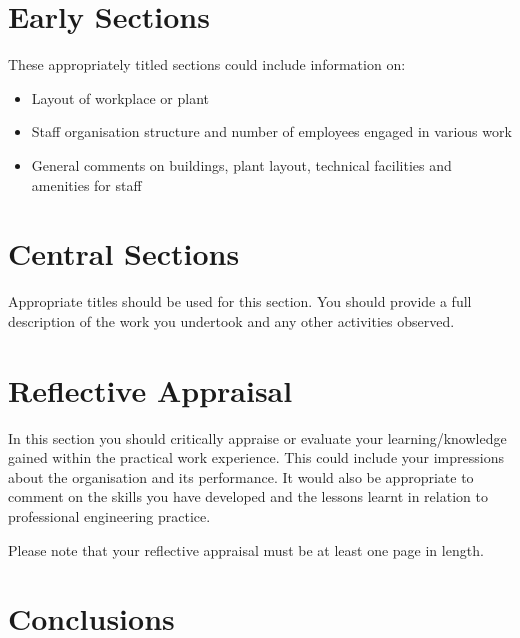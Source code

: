 \documentclass[pdftex, 12pt, a4paper, twoside]{article} %
\let\oldsection\section
\def\section{\clearpage\oldsection}
\begin{document}
\section{Early Sections}
\label{sec:earlysections}

These appropriately titled sections could include information on:

\begin{itemize}
\item Layout of workplace or plant
\item Staff organisation structure and number of employees engaged in various work
\item General comments on buildings, plant layout, technical facilities and amenities for staff
\end{itemize}
\lipsum[1-2]

\section{Central Sections}
\label{sec:centralsections}

Appropriate titles should be used for this section. You should provide a full description of the work you undertook and any other activities observed.
\lipsum[1-2]

\section{Reflective Appraisal}
\label{sec:reflectiveappraisal}

In this section you should critically appraise or evaluate your learning/knowledge gained within the practical work experience. This could include your impressions about the organisation and its performance. It would also be appropriate to comment on the skills you have developed and the lessons learnt in relation to professional engineering practice.

Please note that your reflective appraisal must be at least one page in length. 
\lipsum[1-2]

\section{Conclusions}
\label{sec:conclusions}
\end{document}
